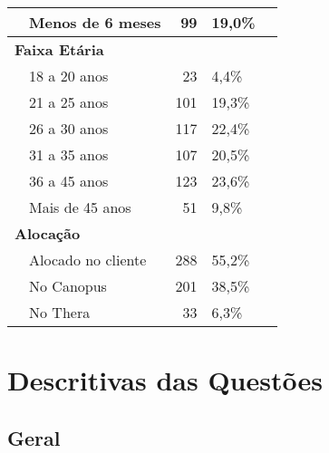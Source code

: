 \documentclass[]{book}
\begin{document}
\begin{table}[t]
\begin{tabular}{l|l|r|l|>{}p{8cm}}
\hline
\hspace{1em} & Menos de 6 meses & 99 & 19,0\%\\
\hline
\multicolumn{4}{l}{\textbf{Faixa Etária}}\\
\hline
\hspace{1em} & 18 a 20 anos & 23 & 4,4\%\\
\hline
\hspace{1em} & 21 a 25 anos & 101 & 19,3\%\\
\hline
\hspace{1em} & 26 a 30 anos & 117 & 22,4\%\\
\hline
\hspace{1em} & 31 a 35 anos & 107 & 20,5\%\\
\hline
\hspace{1em} & 36 a 45 anos & 123 & 23,6\%\\
\hline
\hspace{1em} & Mais de 45 anos & 51 & 9,8\%\\
\hline
\multicolumn{4}{l}{\textbf{Alocação}}\\
\hline
\hspace{1em} & Alocado no cliente & 288 & 55,2\%\\
\hline
\hspace{1em} & No Canopus & 201 & 38,5\%\\
\hline
\hspace{1em} & No Thera & 33 & 6,3\%\\
\hline
\end{tabular}
\end{table}

\hypertarget{descritivas-das-questoes}{%
\chapter{Descritivas das Questões}\label{descritivas-das-questoes}}

\hypertarget{geral}{%
\section{Geral}\label{geral}}
\end{document}
